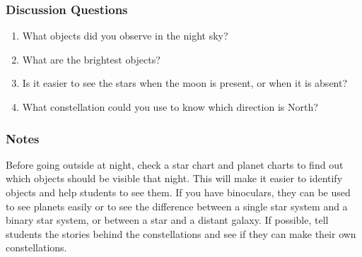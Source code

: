 \subsubsection*{Discussion Questions}
\begin{enumerate}
\item{What objects did you observe in the night sky?}
\item{What are the brightest objects?}
\item{Is it easier to see the stars when the moon is present, or when it is absent?}
\item{What constellation could you use to know which direction is North?}
\end{enumerate}

\subsubsection*{Notes}
Before going outside at night, check a star chart and planet charts to find out which objects should be visible that night. This will make it easier to identify objects and help students to see them. If you have binoculars, they can be used to see planets easily or to see the difference between a single star system and a binary star system, or between a star and a distant galaxy. If possible, tell students the stories behind the constellations and see if they can make their own constellations.
